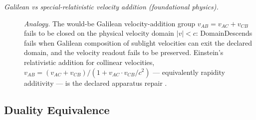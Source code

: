 \begin{description}
\item[\emph{Galilean vs special-relativistic velocity addition
(foundational physics).}] \textit{Analogy.}
The would-be Galilean velocity-addition group \(v_{AB}=v_{AC}+v_{CB}\)
fails to be closed on the physical velocity domain \(|v|<c\):
DomainDescends fails when Galilean composition of sublight
velocities can exit the declared domain, and the velocity readout
fails to be preserved.  Einstein's relativistic addition for collinear velocities,
\(v_{AB}=(v_{AC}+v_{CB})/(1+v_{AC}\cdot v_{CB}/c^2)\) --- equivalently
rapidity additivity --- is the declared apparatus repair
\citep{Einstein1905Elektrodynamik}.
\end{description}
\endgroup

\subsection*{ Duality Equivalence}
\begingroup\small
